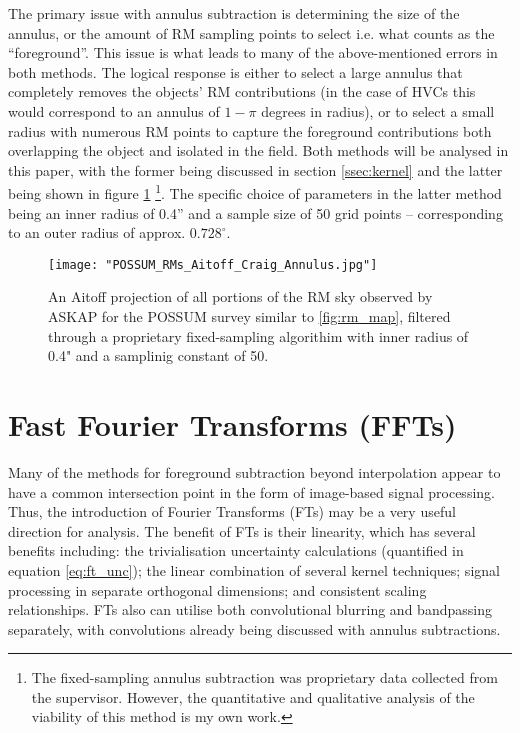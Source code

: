 The primary issue with annulus subtraction is determining the size of the annulus, or the amount of RM sampling points to select i.e. what counts as the “foreground”. This issue is what leads to many of the above-mentioned errors in both methods. The logical response is either to select a large annulus that completely removes the objects' RM contributions (in the case of HVCs this would correspond to an annulus of $1-\pi$ degrees in radius), or to select a small radius with numerous RM points to capture the foreground contributions both overlapping the object and isolated in the field. Both methods will be analysed in this paper, with the former being discussed in section \ref{ssec:kernel} and the latter being shown in figure \ref{fig:annulus_sky} \footnote{The fixed-sampling annulus subtraction was proprietary data collected from the supervisor. However, the quantitative and qualitative analysis of the viability of this method is my own work.}. The specific choice of parameters in the latter method being an inner radius of 0.4” and a sample size of 50 grid points – corresponding to an outer radius of approx. $0.728^{\circ}$.

\begin{figure}
    \texttt{[image: "POSSUM\_RMs\_Aitoff\_Craig\_Annulus.jpg"]}
    \centering
    \caption{An Aitoff projection of all portions of the RM sky observed by ASKAP for the POSSUM survey similar to \ref{fig:rm_map}, filtered through a proprietary fixed-sampling algorithim with inner radius of 0.4" and a samplinig constant of 50.}
    \label{fig:annulus_sky}
\end{figure}

\section{Fast Fourier Transforms (FFTs)}
\label{sec:ffts}

Many of the methods for foreground subtraction beyond interpolation appear to have a common intersection point in the form of image-based signal processing. Thus, the introduction of Fourier Transforms (FTs) may be a very useful direction for analysis. The benefit of FTs is their linearity, which has several benefits including: the trivialisation uncertainty calculations (quantified in equation \ref{eq:ft_unc}); the linear combination of several kernel techniques; signal processing in separate orthogonal dimensions; and consistent scaling relationships. FTs also can utilise both convolutional blurring and bandpassing separately, with convolutions already being discussed with annulus subtractions.


